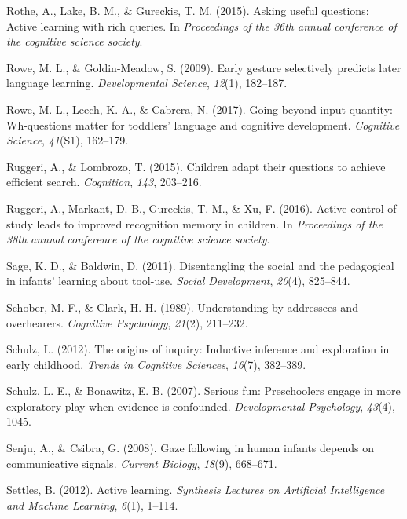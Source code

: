 \documentclass[english,floatsintext,man]{apa6}
\theoremstyle{definition}
\theoremstyle{definition}
\theoremstyle{definition}
\theoremstyle{remark}
\begin{document}
\hypertarget{ref-rothe2015asking}{}
Rothe, A., Lake, B. M., \& Gureckis, T. M. (2015). Asking useful
questions: Active learning with rich queries. In \emph{Proceedings of
the 36th annual conference of the cognitive science society}.

\hypertarget{ref-rowe2009early}{}
Rowe, M. L., \& Goldin-Meadow, S. (2009). Early gesture selectively
predicts later language learning. \emph{Developmental Science},
\emph{12}(1), 182--187.

\hypertarget{ref-rowe2017going}{}
Rowe, M. L., Leech, K. A., \& Cabrera, N. (2017). Going beyond input
quantity: Wh-questions matter for toddlers' language and cognitive
development. \emph{Cognitive Science}, \emph{41}(S1), 162--179.

\hypertarget{ref-ruggeri2015children}{}
Ruggeri, A., \& Lombrozo, T. (2015). Children adapt their questions to
achieve efficient search. \emph{Cognition}, \emph{143}, 203--216.

\hypertarget{ref-ruggeri2016active}{}
Ruggeri, A., Markant, D. B., Gureckis, T. M., \& Xu, F. (2016). Active
control of study leads to improved recognition memory in children. In
\emph{Proceedings of the 38th annual conference of the cognitive science
society}.

\hypertarget{ref-sage2011disentangling}{}
Sage, K. D., \& Baldwin, D. (2011). Disentangling the social and the
pedagogical in infants' learning about tool-use. \emph{Social
Development}, \emph{20}(4), 825--844.

\hypertarget{ref-schober1989understanding}{}
Schober, M. F., \& Clark, H. H. (1989). Understanding by addressees and
overhearers. \emph{Cognitive Psychology}, \emph{21}(2), 211--232.

\hypertarget{ref-schulz2012origins}{}
Schulz, L. (2012). The origins of inquiry: Inductive inference and
exploration in early childhood. \emph{Trends in Cognitive Sciences},
\emph{16}(7), 382--389.

\hypertarget{ref-schulz2007serious}{}
Schulz, L. E., \& Bonawitz, E. B. (2007). Serious fun: Preschoolers
engage in more exploratory play when evidence is confounded.
\emph{Developmental Psychology}, \emph{43}(4), 1045.

\hypertarget{ref-senju2008gaze}{}
Senju, A., \& Csibra, G. (2008). Gaze following in human infants depends
on communicative signals. \emph{Current Biology}, \emph{18}(9),
668--671.

\hypertarget{ref-settles2012active}{}
Settles, B. (2012). Active learning. \emph{Synthesis Lectures on
Artificial Intelligence and Machine Learning}, \emph{6}(1), 1--114.
\end{document}
